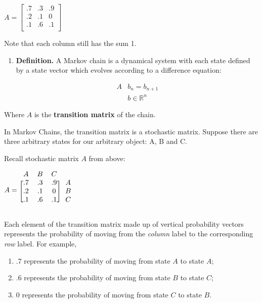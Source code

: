 \documentclass{article}
\begin{document}
\begin{center}
    $A=
    \begin{bmatrix} .7&.3&.9\\.2&.1&0\\.1&.6&.1\\ \end{bmatrix}$
\end{center}

\noindent Note that each column still has the sum 1.

\begin{enumerate}[label=]
    \item \textbf{Definition.} A Markov chain is a dynamical system with each state defined by a state vector which evolves according to a difference equation: 

    \begin{align*}
        A&b_n=b_{n+1} \\
        &b\in\mathbb{R}^n
    \end{align*}
\end{enumerate}

Where $A$ is the \textbf{transition matrix} of the chain.

\noindent In Markov Chains, the transition matrix is a stochastic matrix. Suppose there are three arbitrary states for our arbitrary object: A, B and C. 

Recall stochastic matrix $A$ from above:

\begin{center}
    $A=
    \begin{blockarray}{cccc}
    A & B & C \\
        \begin{block}{[ccc]c} 
            .7&.3&.9 & A\\
            .2&.1& 0 & B\\
            .1&.6&.1 & C\\ 
        \end{block}
    \end{blockarray}$
\end{center}

\noindent Each element of the transition matrix made up of vertical probability vectors represents the probability of moving from the \textit{column} label to the corresponding \textit{row} label. For example, 

\begin{enumerate}[label=]
    \setlength\itemsep{-1em}
    \item.7 represents the probability of moving from state $A$ to state $A$; 
    \item.6 represents the probability of moving from state $B$ to state $C$;
    \item \hspace{3pt}0 represents the probability of moving from state $C$ to state $B$.
\end{enumerate}
\end{document}
